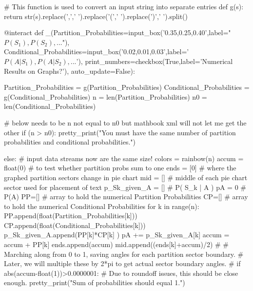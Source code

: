 \documentclass[10pt,]{book}
\numberwithin{equation}{section}
\begin{document}
\par
\hypertarget{BayesSage}{}%
\leavevmode%
\begin{sageinput}
#  This function is used to convert an input string into separate entries
def g(s): return str(s).replace(',',' ').replace('(',' ').replace(')',' ').split()

@interact
def _(Partition_Probabilities=input_box('0.35,0.25,0.40',label="$ P(S_1),P(S_2),... $"),
        Conditional_Probabilities=input_box('0.02,0.01,0.03',label='$ P(A|S_1),P(A|S_2),... $'),
        print_numbers=checkbox(True,label='Numerical Results on Graphs?'),
        auto_update=False):
            
    Partition_Probabilities = g(Partition_Probabilities)
    Conditional_Probabilities = g(Conditional_Probabilities)
    n = len(Partition_Probabilities)
    n0 = len(Conditional_Probabilities)
    
    # below needs to be n not equal to n0 but mathbook xml will not let me get the other
    if (n > n0):
        pretty_print("You must have the same number of partition probabilities and conditional probabilities.")
        
    else:                               # input data streams now are the same size!
        colors = rainbow(n)
        accum = float(0)                # to test whether partition probs sum to one
        ends = [0]                      # where the graphed partition sectors change in pie chart 
        mid = []                        # middle of each pie chart sector used for placement of text
        p_Sk_given_A = []               # P( S_k | A )
        pA = 0                          # P(A)
        PP=[]                           # array to hold the numerical Partition Probabilities 
        CP=[]                           # array to hold the numerical Conditional Probabilities     
        for k in range(n):
            PP.append(float(Partition_Probabilities[k]))
            CP.append(float(Conditional_Probabilities[k]))    
            p_Sk_given_A.append(PP[k]*CP[k] )
            pA += p_Sk_given_A[k]
            accum = accum + PP[k]
            ends.append(accum)
            mid.append((ends[k]+accum)/2)
#
#  Marching along from 0 to 1, saving angles for each partition sector boundary.
#  Later, we will multiple these by 2*pi to get actual sector boundary angles.
#
        if abs(accum-float(1))>0.0000001:     #  Due to roundoff issues, this should be close enough.                     
            pretty_print("Sum of probabilities should equal 1.")
        

\end{sageinput}
\end{document}
